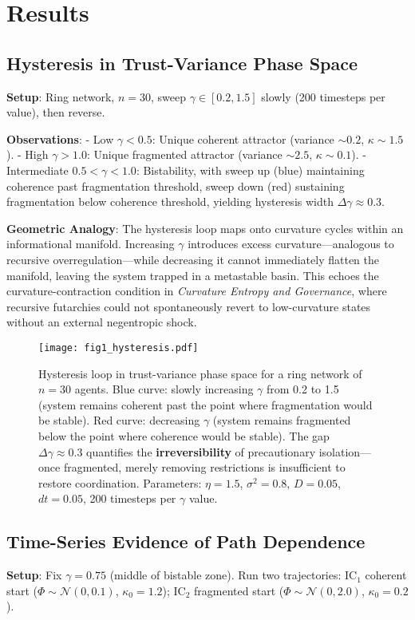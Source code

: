 \documentclass[12pt,a4paper]{article}
\begin{document}
\section{Results}

\subsection{Hysteresis in Trust-Variance Phase Space}
\textbf{Setup}: Ring network, $n=30$, sweep $\gamma \in [0.2, 1.5]$ slowly (200 timesteps per value), then reverse.

\textbf{Observations}:
- Low $\gamma < 0.5$: Unique coherent attractor (variance $\sim 0.2$, $\kappa \sim 1.5$).
- High $\gamma > 1.0$: Unique fragmented attractor (variance $\sim 2.5$, $\kappa \sim 0.1$).
- Intermediate $0.5 < \gamma < 1.0$: Bistability, with sweep up (blue) maintaining coherence past fragmentation threshold, sweep down (red) sustaining fragmentation below coherence threshold, yielding hysteresis width $\Delta \gamma \approx 0.3$.

\textbf{Geometric Analogy}: The hysteresis loop maps onto curvature cycles within an informational manifold. Increasing $\gamma$ introduces excess curvature---analogous to recursive overregulation---while decreasing it cannot immediately flatten the manifold, leaving the system trapped in a metastable basin. This echoes the curvature-contraction condition in \emph{Curvature Entropy and Governance}, where recursive futarchies could not spontaneously revert to low-curvature states without an external negentropic shock.

\begin{figure}[H]
\centering
\texttt{[image: fig1\_hysteresis.pdf]}
\caption{Hysteresis loop in trust-variance phase space for a ring network of $n=30$ agents. Blue curve: slowly increasing $\gamma$ from 0.2 to 1.5 (system remains coherent past the point where fragmentation would be stable). Red curve: decreasing $\gamma$ (system remains fragmented below the point where coherence would be stable). The gap $\Delta\gamma \approx 0.3$ quantifies the \textbf{irreversibility} of precautionary isolation---once fragmented, merely removing restrictions is insufficient to restore coordination. Parameters: $\eta=1.5$, $\sigma^2=0.8$, $D=0.05$, $dt=0.05$, 200 timesteps per $\gamma$ value.}
\label{fig:hysteresis}
\end{figure}

\subsection{Time-Series Evidence of Path Dependence}
\textbf{Setup}: Fix $\gamma = 0.75$ (middle of bistable zone). Run two trajectories: IC$_1$ coherent start ($\Phi \sim \mathcal{N}(0, 0.1)$, $\kappa_0 = 1.2$); IC$_2$ fragmented start ($\Phi \sim \mathcal{N}(0, 2.0)$, $\kappa_0 = 0.2$).
\end{document}
